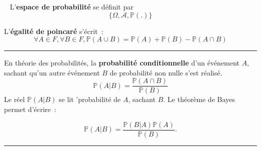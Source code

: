 \begin{f}[Axiomatique]{\ }
	L'\textbf{espace de probabilité} se définit par 
	\[ \lbrace \Omega, \mathcal{A}, \mathbb{P}(.) \rbrace \]
	
	L'\textbf{égalité de poincaré} s'écrit~:
	\[\forall A \in F, \forall B \in F, \mathbb{P} (A \cup B) = \mathbb{P} (A) + \mathbb{P} (B) - \mathbb{P} (A \cap B)\]
	
\end{f}
\hrule

\begin{f}[Bayes]
	En théorie des probabilités, la \textbf{probabilité conditionnelle} d'un événement \(A\), sachant qu'un autre événement \(B\) de probabilité non nulle s'est réalisé.
	\[
	\mathbb{P}(A|B) = \frac{\mathbb{P}(A \cap B)}{\mathbb{P}(B)}
	\]
	Le réel \(\mathbb{P}(A|B)\) se lit 'probabilité de \(A\), sachant \(B\).
	Le théorème de Bayes permet d'écrire~:
	
	\[   \mathbb{P}(A|B) = \frac{\mathbb{P}(B|A)\mathbb{P}(A)}{\mathbb{P}(B)}. \]
\end{f}
\hrule

